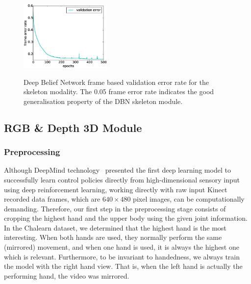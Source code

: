
\begin{figure}[t]
  \centering
  \includegraphics[width=0.4\textwidth]{images/training_error_sk}\\
  \caption{
    Deep Belief Network frame based validation error rate for the skeleton modality.
    The 0.05 frame error rate indicates the good generalisation property of the DBN skeleton module.
    }
    \label{sk_error_rate}
\end{figure}

\subsection{RGB \& Depth 3D Module} \label{sec:rgbd_modules}
\subsubsection{Preprocessing}\label{3d_preproc}

Although DeepMind technology~\cite{mnih2013playing} presented the first deep learning model to successfully learn control policies directly from high-dimensional sensory input using deep reinforcement learning, working directly with raw input Kinect recorded data frames, which are $640 \times 480$ pixel images, can be computationally demanding.
Therefore, our first step in the preprocessing stage consists of cropping the highest hand and the upper body using the given joint information. In the Chalearn dataset, we determined that the highest hand is the most interesting. When both hands are used, they normally perform the same (mirrored) movement, and when one hand is used, it is always the highest one which is relevant.
Furthermore, to be invariant to handedness, we always train the model with the right hand view.
That is, when the left hand is actually the performing hand, the video was mirrored.


